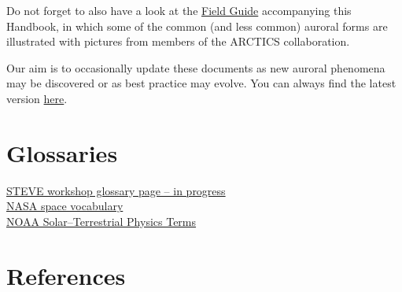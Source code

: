 \documentclass{article}
\begin{document}
Do not forget to also have a look at the \href{https://kherli.github.io/Aurora-Field-Guide-And-Handbook/_static/Aurora_Field_Guide.pdf}{Field Guide} accompanying this Handbook, in which some of the common (and less common) auroral forms are illustrated with pictures from members of the ARCTICS collaboration.

Our aim is to occasionally update these documents as new auroral phenomena may be discovered or as best practice may evolve. You can always find the latest version \href{https://kherli.github.io/Aurora-Field-Guide-And-Handbook/}{here}. 


\section{Glossaries}

\href{https://steve-aurora.github.io/glossary/}{STEVE workshop glossary page -- in progress}\\

\noindent\href{https://science.nasa.gov/heliophysics/resources/vocabulary/}{NASA space vocabulary}\\

\noindent\href{https://www.ngdc.noaa.gov/stp/glossary/glossary.html}{NOAA Solar--Terrestrial Physics Terms}\\


\section{References}
% 
%
\printbibliography[heading=none]

\printindex
\end{document}
